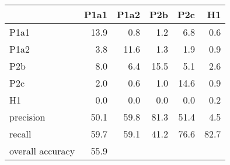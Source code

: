 \begin{tabular}{lrrrrr}
\toprule
{} &  P1a1 &  P1a2 &  P2b &  P2c &   H1 \\
\midrule
P1a1             &  13.9 &   0.8 &  1.2 &  6.8 &  0.6 \\
P1a2             &   3.8 &  11.6 &  1.3 &  1.9 &  0.9 \\
P2b              &   8.0 &   6.4 & 15.5 &  5.1 &  2.6 \\
P2c              &   2.0 &   0.6 &  1.0 & 14.6 &  0.9 \\
H1               &   0.0 &   0.0 &  0.0 &  0.0 &  0.2 \\
precision        &  50.1 &  59.8 & 81.3 & 51.4 &  4.5 \\
recall           &  59.7 &  59.1 & 41.2 & 76.6 & 82.7 \\
overall accuracy &  55.9 &       &      &      &      \\
\bottomrule
\end{tabular}
